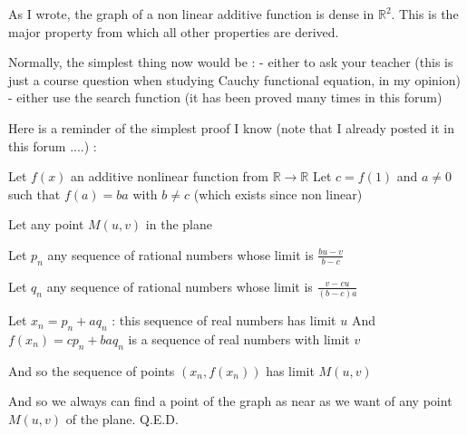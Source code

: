\begin{solution}
	As I wrote, the graph of a non linear additive function is dense in $\mathbb R^2$. This is the major property from which all other properties are derived.

\end{solution}



\begin{solution}
	Normally, the simplest thing now would be :
- either to ask your teacher (this is just a course question when studying Cauchy functional equation, in my opinion)
- either use the search function (it has been proved many times in this forum)

Here is a reminder of the simplest proof I know (note that I already posted it in this forum ....) :

Let $f(x)$ an additive nonlinear function from $\mathbb R\to\mathbb R$
Let $c=f(1)$ and $a\ne 0$ such that $f(a)=ba$ with $b\ne c$ (which exists since non linear)

Let any point $M(u,v)$ in the plane

Let $p_n$ any sequence of rational numbers whose limit is $\frac{bu-v}{b-c}$

Let $q_n$ any sequence of rational numbers whose limit is $\frac{v-cu}{(b-c)a}$

Let $x_n=p_n+aq_n$ : this sequence of real numbers has limit $u$
And $f(x_n)=cp_n+baq_n$ is a sequence of real numbers with limit $v$

And so the sequence of points $(x_n,f(x_n))$ has limit $M(u,v)$

And so we always can find a point of the graph as near as we want of any point $M(u,v)$ of the plane.
Q.E.D.

\end{solution}



